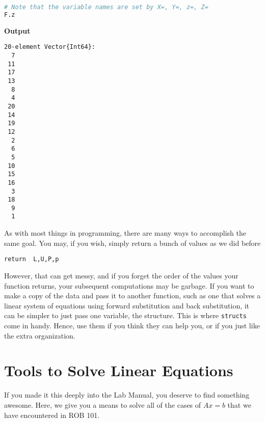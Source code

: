 \begin{lstlisting}[language=Julia,style=mystyle]
# Note that the variable names are set by X=, Y=, z=, Z= 
F.z
\end{lstlisting}
\textbf{Output} 
\begin{verbatim}
20-element Vector{Int64}:
  7
 11
 17
 13
  8
  4
 20
 14
 19
 12
  2
  6
  5
 10
 15
 16
  3
 18
  9
  1
\end{verbatim}




\begin{tcolorbox}[sharp corners, colback=green!30, colframe=green!80!blue,
title=\textbf{\Large Should I Use Structured Returns or Named Tuples?}]

As with most things in programming, there are many ways to accomplish the same goal. You may, if you wish, simply return a bunch of values as we did before\\
\begin{center}
    \texttt{return\, L,U,P,p}
\end{center}
However, that can get messy, and if you forget the order of the values your function returns, your subsequent computations may be garbage. If you want to make a copy of the data and pass it to another function, such as one that solves a linear system of equations using forward substitution and back substitution, it can be simpler to just pass one variable, the structure. This is where \texttt{structs} come in handy. Hence, use them if you think they can help you, or if you just like the extra organization. 
\end{tcolorbox}


\section{Tools to Solve Linear Equations}

If you made it this deeply into the Lab Manual, you deserve to find something awesome. Here, we give you a means to solve all of the cases of $Ax=b$ that we have encountered in ROB 101.\\

